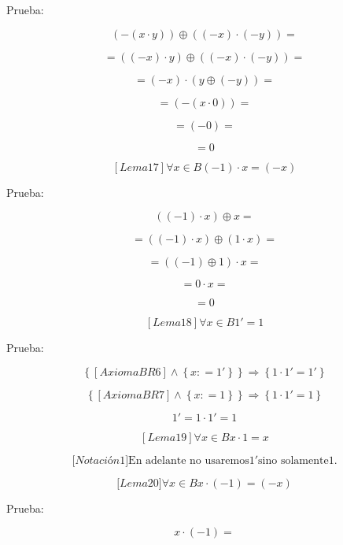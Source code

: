 \begin{enumerate}
\begin{enumerate}
\begin{enumerate}
      Prueba:

      \[\left( {- \left( {x \cdot y} \right)} \right) \oplus {\left( {\left( {- x} \right) \cdot \left( {- y} \right)} \right) =}\]

      \[{= \left( {\left( {- x} \right) \cdot y} \right)} \oplus {\left( {\left( {- x} \right) \cdot \left( {- y} \right)} \right) =}\]

      \[{= {\left( {- x} \right) \cdot \left( {y \oplus \left( {- y} \right)} \right)}} =\]

      \[{= \left( {- \left( {x \cdot 0} \right)} \right)} =\]

      \[{= \left( {- 0} \right)} =\]

      \[= 0\]

      \[\left\lbrack {{Lema}17} \right\rbrack\forall{x \in B}{{\left( {- 1} \right) \cdot x} = \left( {- x} \right)}\]

      Prueba:

      \[\left( {\left( {- 1} \right) \cdot x} \right) \oplus {x =}\]

      \[{= \left( {\left( {- 1} \right) \cdot x} \right)} \oplus {\left( {1 \cdot x} \right) =}\]

      \[{= {\left( {\left( {- 1} \right) \oplus 1} \right) \cdot x}} =\]

      \[{= {0 \cdot x}} =\]

      \[= 0\]

      \[\left\lbrack {{Lema}18} \right\rbrack\forall{x \in B}1{' = 1}\]

      Prueba:

      \[\left\{ {\left\lbrack {{Axioma}{BR6}} \right\rbrack \land \left\{ {x{: = 1}'} \right\}} \right\}\Rightarrow\left\{ {{1 \cdot 1}{' = 1}'} \right\}\]

      \[\left\{ {\left\lbrack {{Axioma}{BR7}} \right\rbrack \land \left\{ {x{: = 1}} \right\}} \right\}\Rightarrow\left\{ {{1 \cdot 1}{' = 1}} \right\}\]

      \[1{' = {1 \cdot 1}}{' = 1}\]

      \[\left\lbrack {{Lema}19} \right\rbrack\forall{x \in B}{{x \cdot 1} = x}\]

      \[{\lbrack{{Notación}1}\rbrack}\text{En adelante no usaremos}1'\text{sino solamente}1\text{.}\]

      \[{\lbrack{{Lema}20}\rbrack}\forall{x \in B}{{x \cdot \left( {- 1} \right)} = \left( {- x} \right)}\]

      Prueba:

      \[{x \cdot \left( {- 1} \right)} =\]


\end{enumerate}
\end{enumerate}
\end{enumerate}

